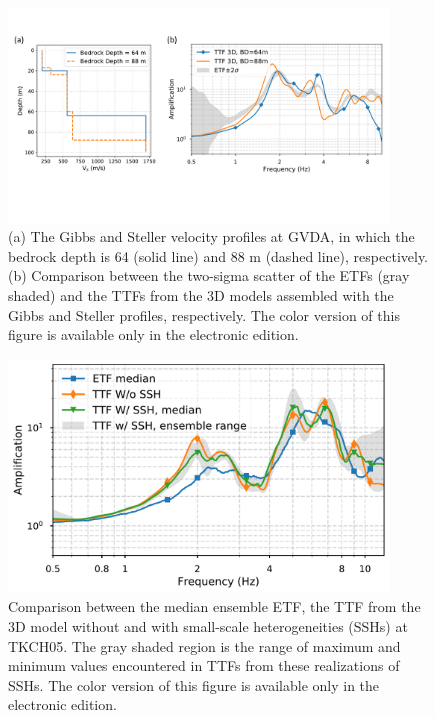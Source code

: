 {\clearpage
\begin{figure}[!ht]
  \centering
  \includegraphics[width=0.9\textwidth]{figures/figure_etf_9.pdf}
  \caption{(a) The Gibbs and Steller velocity profiles at GVDA, in which the bedrock depth is 64 (solid line) and 88 m (dashed line), respectively. (b) Comparison between the two-sigma scatter of the ETFs (gray shaded) and the TTFs from the 3D models assembled with the Gibbs and Steller profiles, respectively. The color version of this figure is available only in the electronic edition.}
  \label{fig:etf-9}
\end{figure}

\clearpage
\begin{figure}[!ht]
  \centering
  \includegraphics[width=0.9\textwidth]{figures/figure_etf_10.pdf}
  \caption{Comparison between the median ensemble ETF, the TTF from the 3D model without and with small-scale heterogeneities (SSHs) at TKCH05. The gray shaded region is the range of maximum and minimum values encountered in TTFs from these realizations of SSHs. The color version of this figure is available only in the electronic edition.}
  \label{fig:etf-10}
\end{figure}

}
